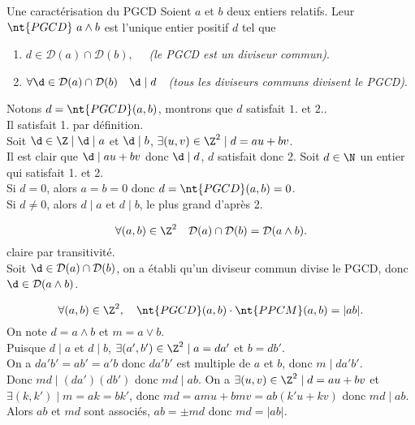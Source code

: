 \documentclass[11pt]{article}
\newcommand*{\PPCM}{\nt{PPCM}}
\newcommand*{\PGCD}{\nt{PGCD}}
\renewcommand*{\D}{\mathcal{D}}
\begin{document}
\begin{thm}{Une caractérisation du PGCD}{}
    Soient $a$ et $b$ deux entiers relatifs. Leur $\PGCD~a\land b$ est l'unique entier positif $d$ tel que
    \begin{enumerate}[topsep=0pt,itemsep=-0.9 ex]
        \item $d\in\D(a)\cap\D(b),\quad$ \emph{(le PGCD est un diviseur commun)}.
        \item $\forall \d\in\D(a)\cap\D(b)\quad\d\mid d\quad$\emph{(tous les diviseurs communs divisent le PGCD)}.
    \end{enumerate}
    \tcblower
    Notons $d=\PGCD(a,b)$, montrons que $d$ satisfait $1.$ et $2.$.\\
    Il satisfait 1. par définition.\\
    Soit $\d\in\Z\mid\d\mid a$ et $\d\mid b$, $\exists (u,v)\in\Z^2\mid d=au+bv$.\\
    Il est clair que $\d\mid au+bv$ donc $\d\mid d$, $d$ satisfait donc 2.\n
    Soit $d\in\N$ un entier qui satisfait 1. et 2.\\
    Si $d=0$, alors $a=b=0$ donc $d=\PGCD(a,b)=0$.\\
    Si $d\neq0$, alors $d\mid a$ et $d\mid b$, le plus grand d'après 2.
\end{thm}

\begin{corr}{}{}
    \begin{equation*}
        \forall(a,b)\in\Z^2\quad\D(a)\cap\D(b)=\D(a\land b).
    \end{equation*}
    \tcblower
    \fbox{$\supset$} claire par transitivité.\\
    \fbox{$\subset$} Soit $\d\in\D(a)\cap\D(b)$, on a établi qu'un diviseur commun divise le PGCD, donc $\d\in\D(a\land b)$.
\end{corr}

\begin{prop}{}{}
    \begin{equation*}
        \forall(a,b)\in\Z^2,\quad\PGCD(a,b)\cdot\PPCM(a,b)=|ab|.
    \end{equation*}
    \tcblower
    On note $d=a\land b$ et $m=a\lor b$.\\
    Puisque $d\mid a$ et $d\mid b$, $\exists (a',b')\in\Z^2\mid a=da'$ et $b=db'$.\\
    On a $da'b'=ab'=a'b$ donc $da'b'$ est multiple de $a$ et $b$, donc $m\mid da'b'$.\\
    Donc $md\mid (da')(db')$ donc $md\mid ab$.\n
    On a $\exists (u,v)\in\Z^2\mid d=au+bv$ et $\exists (k,k')\mid m=ak=bk'$, donc $md=amu+bmv=ab(k'u+kv)$ donc $md\mid ab$.\n
    Alors $ab$ et $md$ sont associés, $ab=\pm md$ donc $md=|ab|$. 
\end{prop}
\end{document}

